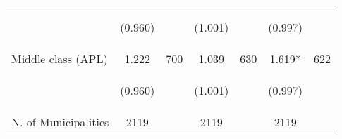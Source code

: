 \begin{tabular}{lcccccc}
\vspace{4pt} &  \begin{footnotesize}(0.960)\end{footnotesize}   & &
			    \begin{footnotesize}(1.001)\end{footnotesize}   & &
			    \begin{footnotesize}(0.997)\end{footnotesize}   &
			     \\

Middle class (APL)  &  1.222   &  700  &   1.039  &  630 &  1.619*  &  622   \\


\vspace{4pt} &  \begin{footnotesize}(0.960)\end{footnotesize}   & &
			    \begin{footnotesize}(1.001)\end{footnotesize}   & &
			    \begin{footnotesize}(0.997)\end{footnotesize}   &
			     \\

N. of Municipalities   &   2119   & &    2119 &    &  2119  &   \\
\hline	


\end{tabular}%
